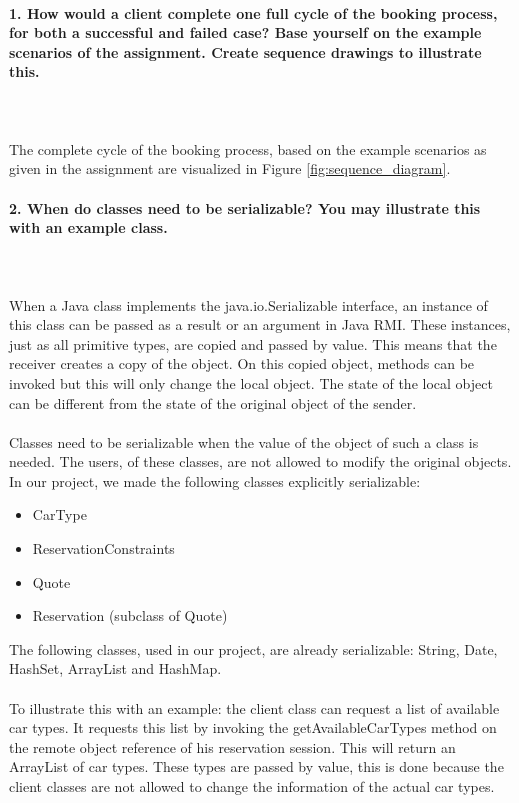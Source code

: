 \documentclass{ds-report}
\begin{document}
	\maketitle

	\paragraph{1. How would a client complete one full cycle of the booking process, for both a successful and
failed case? Base yourself on the example scenarios of the assignment. Create sequence drawings to illustrate this.} \mbox{}\\\\
The complete cycle of the booking process, based on the example scenarios as given in the assignment are visualized in Figure \ref{fig:sequence_diagram}.

	
	\paragraph{2. When do classes need to be serializable? You may illustrate this with an example class.} \mbox{}\\\\
When a Java class implements the java.io.Serializable interface, an instance of this class can be passed as a result or an argument in Java RMI. These instances, just as all primitive types, are copied and passed by value. This means that the receiver creates a copy of the object. On this copied object, methods can be invoked but this will only change the local object. The state of the local object can be different from the state of the original object of the sender. \\\\
Classes need to be serializable when the value of the object of such a class is needed. The users, of these classes, are not allowed to modify the original objects. In our project, we made the following classes explicitly serializable:
\begin{itemize}
	\item CarType 
	\item ReservationConstraints 
	\item Quote
	\item Reservation (subclass of Quote)
\end{itemize}
The following classes, used in our project, are already serializable: String, Date, HashSet, ArrayList and HashMap.\\\\
To illustrate this with an example: the client class can request a list of available car types. It requests this list by invoking the getAvailableCarTypes method on the remote object reference of his reservation session. This will return an ArrayList of car types. These types are passed by value, this is done because the client classes are not allowed to change the information of the actual car types.
\clearpage
\end{document}
